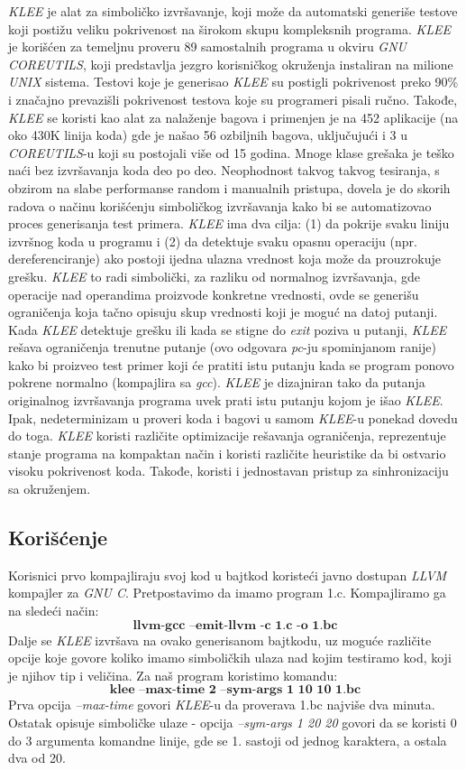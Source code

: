 \documentclass[a4paper]{article}
\begin{document}
\textit{KLEE} je alat za simboličko izvršavanje, koji može da automatski generiše testove koji postižu veliku pokrivenost na širokom skupu kompleksnih programa. \textit{KLEE} je korišćen za temeljnu proveru 89 samostalnih programa u okviru \textit{GNU COREUTILS}, koji predstavlja jezgro korisničkog okruženja instaliran na milione \textit{UNIX} sistema. Testovi koje je generisao \textit {KLEE} su postigli pokrivenost preko 90\% i značajno prevazišli pokrivenost testova koje su programeri pisali ručno. Takođe, \textit{KLEE} se koristi kao alat za nalaženje bagova i primenjen je na 452 aplikacije (na oko 430K linija koda) gde je našao 56 ozbiljnih bagova, uključujući i 3 u \textit{COREUTILS}-u koji su postojali više od 15 godina.
Mnoge klase grešaka je teško naći bez izvršavanja koda deo po deo. Neophodnost takvog takvog tesiranja, s obzirom na slabe performanse random i manualnih pristupa, dovela je do skorih radova o načinu korišćenju simboličkog izvršavanja kako bi se automatizovao proces generisanja test primera. \textit{KLEE} ima dva cilja:
(1) da pokrije svaku liniju izvršnog koda u programu i (2) da detektuje svaku opasnu operaciju (npr. dereferenciranje) ako postoji ijedna ulazna vrednost koja može da prouzrokuje grešku. \textit{KLEE} to radi simbolički, za razliku od normalnog izvršavanja, gde operacije nad operandima proizvode konkretne vrednosti, ovde se generišu ograničenja koja tačno opisuju skup vrednosti koji je moguć na datoj putanji. Kada \textit{KLEE} detektuje grešku ili kada se stigne do \textit{exit} poziva u putanji, \textit{KLEE} rešava ograničenja trenutne putanje (ovo odgovara \textit{pc}-ju spominjanom ranije) kako bi proizveo test primer koji će pratiti istu putanju kada se program ponovo pokrene normalno (kompajlira sa \textit{gcc}). \textit{KLEE} je dizajniran tako da putanja originalnog izvršavanja programa uvek prati istu putanju kojom je išao \textit{KLEE}. Ipak, nedeterminizam u proveri koda i bagovi u samom \textit{KLEE}-u ponekad dovedu do toga. \textit{KLEE} koristi različite optimizacije rešavanja ograničenja, reprezentuje stanje programa na kompaktan način i koristi različite heuristike da bi ostvario visoku pokrivenost koda. Takođe, koristi i jednostavan pristup za sinhronizaciju sa okruženjem.\cite{klee}

\subsection{Korišćenje}
\label{subsec:podnaslov1}
Korisnici prvo kompajliraju svoj kod u bajtkod koristeći javno dostupan \textit{LLVM} kompajler za \textit{GNU C}. Pretpostavimo da imamo program 1.c. Kompajliramo ga na sledeći način: 
\[\textbf{llvm-gcc --emit-llvm -c 1.c -o 1.bc}\] 
Dalje se \textit{KLEE} izvršava na ovako generisanom bajtkodu, uz moguće različite opcije koje govore koliko imamo simboličkih ulaza nad kojim testiramo kod, koji je njihov tip i veličina. Za naš program koristimo komandu: 
\[\textbf{klee --max-time 2 --sym-args 1 10 10 1.bc} \]
Prva opcija \textit{--max-time} govori \textit{KLEE}-u da proverava 1.bc najviše dva minuta. Ostatak opisuje simboličke ulaze - opcija \textit{--sym-args 1 20 20}
govori da se koristi 0  do 3 argumenta komandne linije, gde se 1. sastoji od jednog  karaktera, a ostala dva od 20. 
\end{document}
